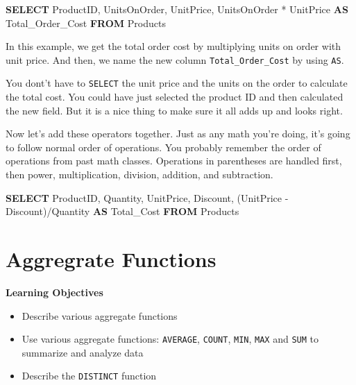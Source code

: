 \documentclass[]{book}
\makeatletter
\newenvironment{Shaded}{\begin{snugshade}}{\end{snugshade}}
\newcommand{\KeywordTok}[1]{\textcolor[rgb]{0.13,0.29,0.53}{\textbf{{#1}}}}
\newcommand{\NormalTok}[1]{{#1}}
\providecommand{\tightlist}{%
  \setlength{\itemsep}{0pt}\setlength{\parskip}{0pt}}
\newenvironment{kframe}{%
\medskip{}
\setlength{\fboxsep}{.8em}
 \def\at@end@of@kframe{}%
 \ifinner\ifhmode%
  \def\at@end@of@kframe{\end{minipage}}%
  \begin{minipage}{\columnwidth}%
 \fi\fi%
 \def\FrameCommand##1{\hskip\@totalleftmargin \hskip-\fboxsep
 \colorbox{shadecolor}{##1}\hskip-\fboxsep
     \hskip-\linewidth \hskip-\@totalleftmargin \hskip\columnwidth}%
 \MakeFramed {\advance\hsize-\width
   \@totalleftmargin\z@ \linewidth\hsize
   \@setminipage}}%
 {\par\unskip\endMakeFramed%
 \at@end@of@kframe}
\renewenvironment{Shaded}{\begin{kframe}}{\end{kframe}}
\theoremstyle{definition}
\theoremstyle{definition}
\theoremstyle{remark}
\makeatother
\begin{document}
\begin{Shaded}
\begin{Highlighting}[]
\KeywordTok{SELECT} 
\NormalTok{ProductID,}
\NormalTok{UnitsOnOrder,}
\NormalTok{UnitPrice,}
\NormalTok{UnitsOnOrder * UnitPrice }\KeywordTok{AS} \NormalTok{Total_Order_Cost}
\KeywordTok{FROM} \NormalTok{Products}
\end{Highlighting}
\end{Shaded}

In this example, we get the total order cost by multiplying units on
order with unit price. And then, we name the new column
\texttt{Total\_Order\_Cost} by using \texttt{AS}.

You dont't have to \texttt{SELECT} the unit price and the units on the
order to calculate the total cost. You could have just selected the
product ID and then calculated the new field. But it is a nice thing to
make sure it all adds up and looks right.

Now let's add these operators together. Just as any math you're doing,
it's going to follow normal order of operations. You probably remember
the order of operations from past math classes. Operations in
parentheses are handled first, then power, multiplication, division,
addition, and subtraction.

\begin{Shaded}
\begin{Highlighting}[]
\KeywordTok{SELECT}
\NormalTok{ProductID,}
\NormalTok{Quantity,}
\NormalTok{UnitPrice,}
\NormalTok{Discount,}
\NormalTok{(UnitPrice - Discount)/Quantity }\KeywordTok{AS} \NormalTok{Total_Cost}
\KeywordTok{FROM} \NormalTok{Products}
\end{Highlighting}
\end{Shaded}

\section{Aggregrate Functions}\label{aggregrate-functions}

\textbf{Learning Objectives}

\begin{itemize}
\tightlist
\item
  Describe various aggregate functions
\item
  Use various aggregate functions: \texttt{AVERAGE}, \texttt{COUNT},
  \texttt{MIN}, \texttt{MAX} and \texttt{SUM} to summarize and analyze
  data
\item
  Describe the \texttt{DISTINCT} function
\end{itemize}
\end{document}
